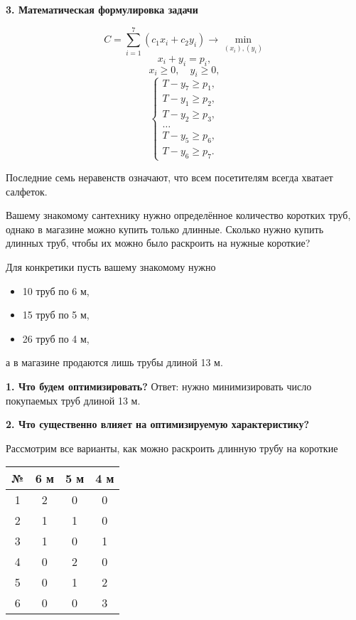\textbf{3. Математическая формулировка задачи}

\[
C = \sum_{i=1}^7 (c_1 x_i + c_2 y_i) \to \min_{(x_i), (y_i)}
\]
\[
x_i + y_i = p_i,
\]
\[
x_i \ge 0, \quad y_i \ge 0,
\]
\[
\begin{cases}
	T - y_7 \ge p_1, \\
	T - y_1 \ge p_2, \\
	T - y_2 \ge p_3, \\
	\dots \\
	T - y_5 \ge p_6, \\
	T - y_6 \ge p_7.
\end{cases}
\]

Последние семь неравенств означают, что всем посетителям всегда хватает салфеток.

\problem[раскроя]

Вашему знакомому сантехнику нужно определённое количество коротких труб, однако в магазине можно купить только длинные. Сколько нужно купить длинных труб, чтобы их можно было раскроить на нужные короткие?

Для конкретики пусть вашему знакомому нужно
\begin{itemize}[nosep]
	\item 10 труб по 6 м,
	
	\item 15 труб по 5 м,
	
	\item 26 труб по 4 м,
\end{itemize}

а в магазине продаются лишь трубы длиной 13 м.

\solution

\textbf{1. Что будем оптимизировать?} Ответ: нужно минимизировать число покупаемых труб длиной 13 м.

\textbf{2. Что существенно влияет на оптимизируемую характеристику?}

Рассмотрим все варианты, как можно раскроить длинную трубу на короткие

\begin{table}[h!]
	\centering
	\begin{tabular}{| c | c | c | c | } 
		\hline
		№ & 6 м & 5 м & 4 м \\ 
		\hline
		1 & 2 & 0 & 0 \\\hline
		2 & 1 & 1 & 0 \\\hline
		3 & 1 & 0 & 1 \\\hline
		4 & 0 & 2 & 0 \\\hline
		5 & 0 & 1 & 2 \\\hline
		6 & 0 & 0 & 3 \\\hline
	\end{tabular}
\end{table}

